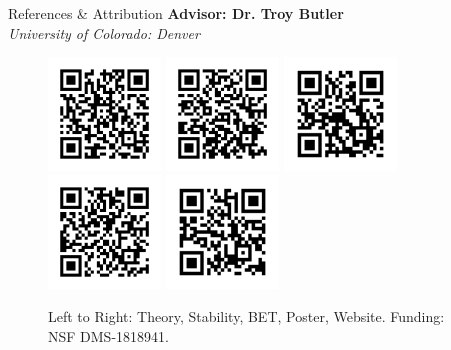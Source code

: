 \begin{block}{References \& Attribution}
    \centering
    \textbf{Advisor: Dr. Troy Butler}\\
    \textit{University of Colorado: Denver}
    \begin{figure}
    \centering
        \includegraphics[width=3cm]{figures/ref-theory}
        \includegraphics[width=3cm]{figures/ref-stability}
        \includegraphics[width=3cm]{figures/ref-bet}
        \includegraphics[width=3cm]{figures/ref-jsm}
        \includegraphics[width=3cm]{figures/ref-website}
    \caption{\centering Left to Right: Theory, Stability, BET, Poster, Website. Funding: NSF DMS-1818941.}
    \end{figure}

\end{block}

